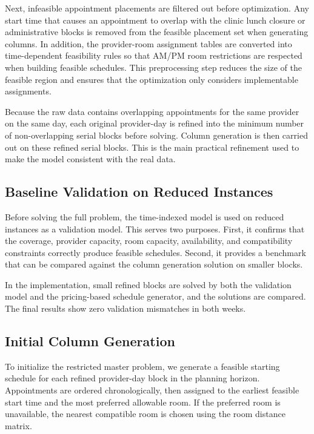 \documentclass[12pt]{article}
\begin{document}
Next, infeasible appointment placements are filtered out before optimization. Any start time
that causes an appointment to overlap with the clinic lunch closure or administrative blocks is
removed from the feasible placement set when generating columns. In addition, the provider-room
assignment tables are converted into time-dependent feasibility rules so that AM/PM room
restrictions are respected when building feasible schedules. This preprocessing step reduces the
size of the feasible region and ensures that the optimization only considers implementable assignments.

Because the raw data contains overlapping appointments for the same provider on the same
day, each original provider-day is refined into the minimum number of non-overlapping serial
blocks before solving. Column generation is then carried out on these refined serial blocks. This
is the main practical refinement used to make the model consistent with the real data.

\subsection*{Baseline Validation on Reduced Instances}

Before solving the full problem, the time-indexed model is used on reduced instances as a
validation model. This serves two purposes. First, it confirms that the coverage, provider
capacity, room capacity, availability, and compatibility constraints correctly produce feasible
schedules. Second, it provides a benchmark that can be compared against the column generation
solution on smaller blocks.

In the implementation, small refined blocks are solved by both the validation model and the
pricing-based schedule generator, and the solutions are compared. The final results show zero
validation mismatches in both weeks.

\subsection*{Initial Column Generation}

To initialize the restricted master problem, we generate a feasible starting schedule for each
refined provider-day block in the planning horizon. Appointments are ordered chronologically,
then assigned to the earliest feasible start time and the most preferred allowable room. If the
preferred room is unavailable, the nearest compatible room is chosen using the room distance matrix.
\end{document}
